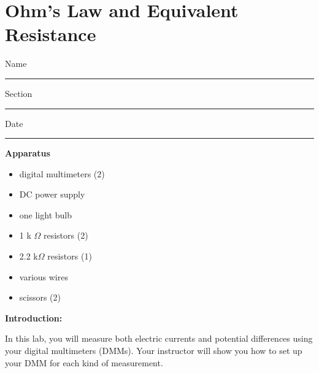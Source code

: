 
\section{Ohm's Law and Equivalent Resistance}

Name \rule{2.0in}{0.1pt}\hfill{}Section \rule{1.0in}{0.1pt}\hfill{}Date
\rule{1.0in}{0.1pt}

\textbf{Apparatus}
\begin{itemize}
\item digital multimeters (2)
\item DC power supply 
\item one light bulb
\item 1 k $\Omega$ resistors (2)
\item 2.2 k$\Omega$ resistors (1)
\item various wires
\item scissors (2)
\end{itemize}

\textbf{Introduction:}

In this lab, you will measure both electric currents and potential differences using your digital multimeters (DMMs).  Your instructor will show you how to set up your DMM for each kind of measurement.

